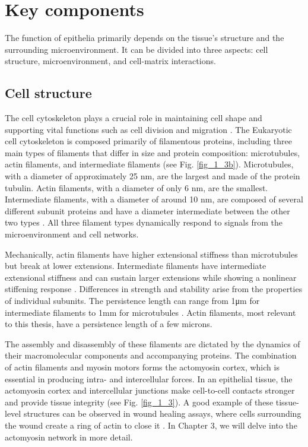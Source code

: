 \hypertarget{key-components}{%
	\section{Key components}\label{key-components}}

The function of epithelia primarily depends on the tissue's structure and the surrounding microenvironment. It can be divided into three aspects: cell structure, microenvironment, and cell-matrix interactions.

\hypertarget{cell-structure}{%
	\subsection{Cell structure}\label{cell-structure}}

The cell cytoskeleton plays a crucial role in maintaining cell shape and supporting vital functions such as cell division and migration \cite{alberts2015}. The Eukaryotic cell cytoskeleton is composed primarily of filamentous proteins, including three main types of filaments that differ in size and protein composition: microtubules, actin filaments, and intermediate filaments (see Fig. \ref{fig_1_3b}). Microtubules, with a diameter of approximately 25 nm, are the largest and made of the protein tubulin. Actin filaments, with a diameter of only 6 nm, are the smallest. Intermediate filaments, with a diameter of around 10 nm, are composed of several different subunit proteins and have a diameter intermediate between the other two types \cite{mofrad2009}. All three filament types dynamically respond to signals from the microenvironment and cell networks.

Mechanically, actin filaments have higher extensional stiffness than microtubules but break at lower extensions. Intermediate filaments have intermediate extensional stiffness and can sustain larger extensions while showing a nonlinear stiffening response \cite{wen2011}. Differences in strength and stability arise from the properties of individual subunits. The persistence length can range from 1\unit{\um} for intermediate filaments to 1\unit{\mm} for microtubules \cite{fletcher2010}. Actin filaments, most relevant to this thesis, have a persistence length of a few microns.

The assembly and disassembly of these filaments are dictated by the dynamics of their macromolecular components and accompanying proteins. The combination of actin filaments and myosin motors forms the actomyosin cortex, which is essential in producing intra- and intercellular forces. In an epithelial tissue, the actomyosin cortex and intercellular junctions make cell-to-cell contacts stronger and provide tissue integrity \cite{braga2016} (see Fig. \ref{fig_1_3}). A good example of these tissue-level structures can be observed in wound healing assays, where cells surrounding the wound create a ring of actin to close it \cite{brugues2014}. In Chapter 3, we will delve into the actomyosin network in more detail.


